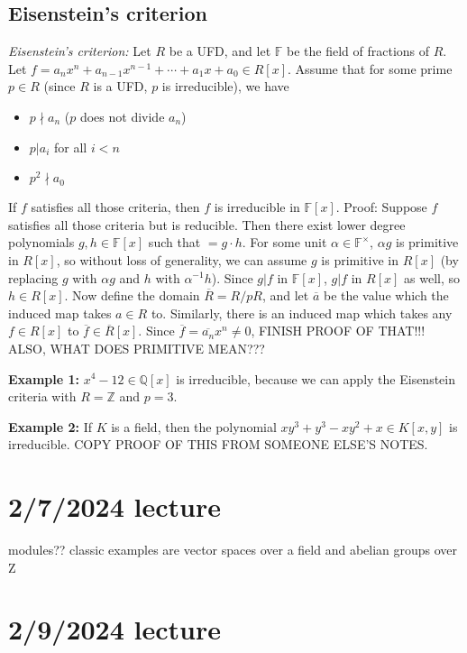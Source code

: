 \documentclass[12pt]{article}
\begin{document}
\subsection{Eisenstein's criterion}
\textit{Eisenstein's criterion:} Let $R$ be a UFD, and let $\mathbb{F}$ be the field of fractions of $R$. Let $f = a_n x^n + a_{n-1} x^{n-1} + \cdots + a_1 x + a_0 \in R[x]$. Assume that for some prime $p \in R$ (since $R$ is a UFD, $p$ is irreducible), we have
\begin{itemize}
    \item $p \nmid a_n$ ($p$ does not divide $a_n$)
    \item $p|a_i$ for all $i < n$
    \item $p^2 \nmid a_0$
\end{itemize}
If $f$ satisfies all those criteria, then $f$ is irreducible in $\mathbb{F}[x]$. Proof: Suppose $f$ satisfies all those criteria but is reducible. Then there exist lower degree polynomials $g,h \in \mathbb{F}[x]$ such that $=g \cdot h$. For some unit $\alpha \in \mathbb{F}^\times$, $\alpha g$ is primitive in $R[x]$, so without loss of generality, we can assume $g$ is primitive in $R[x]$ (by replacing $g$ with $\alpha g$ and $h$ with $\alpha^{-1} h$). Since $g|f$ in $\mathbb{F}[x]$, $g|f$ in $R[x]$ as well, so $h \in R[x]$. Now define the domain $\overline{R} = R/pR$, and let $\overline{a}$ be the value which the induced map takes $a \in R$ to. Similarly, there is an induced map which takes any $f \in R[x]$ to $\overline{f} \in \overline{R}[x]$. Since $\overline{f} = \overline{a_n} x^n \neq 0$,
FINISH PROOF OF THAT!!! ALSO, WHAT DOES PRIMITIVE MEAN???
\par
\textbf{Example 1:} $x^4-12 \in \mathbb{Q}[x]$ is irreducible, because we can apply the Eisenstein criteria with $R=\mathbb{Z}$ and $p=3$.
\par
\textbf{Example 2:} If $K$ is a field, then the polynomial $xy^3+y^3-xy^2+x \in K[x,y]$ is irreducible. COPY PROOF OF THIS FROM SOMEONE ELSE'S NOTES.

\section{2/7/2024 lecture}
modules?? classic examples are vector spaces over a field and abelian groups over Z

\section{2/9/2024 lecture}
\end{document}
